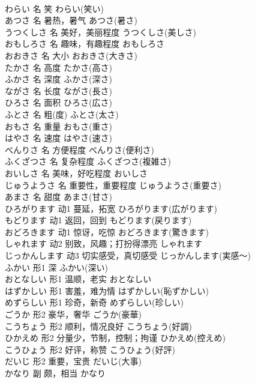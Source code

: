 \documentclass[8pt]{extreport}
\begin{document}
\begin{CJK}{UTF8}{min}
\\	わらい	名	笑	わらい(笑い)	
\\	あつさ	名	暑热，暑气	あつさ(暑さ)	
\\	うつくしさ	名	美好，美丽程度	うつくしさ(美しさ)	
\\	おもしろさ	名	趣味，有趣程度	おもしろさ	
\\	おおきさ	名	大小	おおきさ(大きさ)	
\\	たかさ	名	高度	たかさ(高さ)	
\\	ふかさ	名	深度	ふかさ(深さ)	
\\	ながさ	名	长度	ながさ(長さ)	
\\	ひろさ	名	面积	ひろさ(広さ)	
\\	ふとさ	名	粗(度)	ふとさ(太さ)	
\\	おもさ	名	重量	おもさ(重さ)	
\\	はやさ	名	速度	はやさ(速さ)	
\\	べんりさ	名	方便程度	べんりさ(便利さ)	
\\	ふくざつさ	名	复杂程度	ふくざつさ(複雑さ)	
\\	おいしさ	名	美味，好吃程度	おいしさ	
\\	じゅうようさ	名	重要性，重要程度	じゅうようさ(重要さ)	
\\	あまさ	名	甜度	あまさ(甘さ)	
\\	ひろがります	动1	蔓延，拓宽	ひろがります(広がります)	
\\	もどります	动1	返回，回到	もどります(戻ります)	
\\	おどろきます	动1	惊讶，吃惊	おどろきます(驚きます)	
\\	しゃれます	动2	别致，风趣；打扮得漂亮	しゃれます	
\\	じっかんします	动3	切实感受，真切感受	じっかんします(実感～)	
\\	ふかい	形1	深	ふかい(深い)	
\\	おとなしい	形1	温顺，老实	おとなしい	
\\	はずかしい	形1	害羞，难为情	はずかしい(恥ずかしい)	
\\	めずらしい	形1	珍奇，新奇	めずらしい(珍しい)	
\\	ごうか	形2	豪华，奢华	ごうか(豪華)	
\\	こうちょう	形2	顺利，情况良好	こうちょう(好調)	
\\	ひかえめ	形2	分量少，节制，控制；拘谨	ひかえめ(控えめ)	
\\	こうひょう	形2	好评，称赞	こうひょう(好評)	
\\	だいじ	形2	重要，宝贵	だいじ(大事)	
\\	かなり	副	颇，相当	かなり	

\end{CJK}
\end{document}
